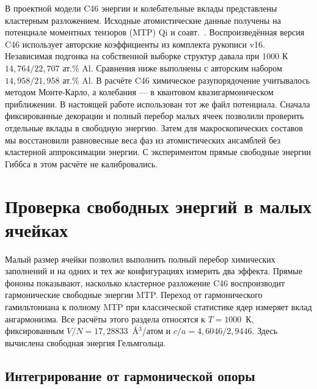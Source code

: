 \documentclass[11pt,a4paper]{article}
\begin{document}
В проектной модели C46 энергии и колебательные вклады представлены
кластерным разложением. Исходные атомистические данные получены на
потенциале моментных тензоров (MTP) Qi и соавт.~\cite{qi2023}.
Воспроизведённая версия C46 использует авторские коэффициенты из комплекта
рукописи v16. Независимая подгонка на собственной выборке структур давала
при 1000 К \(14{,}764/22{,}707\) ат.\% Al. Сравнения ниже выполнены с
авторским набором \(14{,}958/21{,}958\) ат.\% Al.
В расчёте C46 химическое разупорядочение учитывалось методом
Монте-Карло, а колебания — в квантовом квазигармоническом приближении.
В настоящей работе использован тот же файл потенциала. Сначала фиксированные
декорации и полный перебор малых ячеек позволили проверить отдельные
вклады в свободную энергию. Затем для макроскопических составов мы
восстановили равновесные веса фаз из атомистических ансамблей без
кластерной аппроксимации энергии. С экспериментом прямые свободные
энергии Гиббса в этом расчёте не калибровались.

\section{Проверка свободных энергий в малых ячейках}
\label{sec:smallcells}

Малый размер ячейки позволил выполнить полный перебор химических заполнений и
на одних и тех же конфигурациях измерить два эффекта. Прямые фононы показывают,
насколько кластерное разложение C46 воспроизводит гармонические свободные
энергии MTP. Переход от гармонического гамильтониана к полному MTP при
классической статистике ядер измеряет вклад ангармонизма. Все расчёты этого
раздела относятся к $T=1000$~К, фиксированным $V/N=17{,}28833$~\AA$^3$/атом
и $c/a=4{,}6046/2{,}9446$. Здесь вычислена свободная энергия Гельмгольца.

\subsection{Интегрирование от гармонической опоры}
\end{document}
